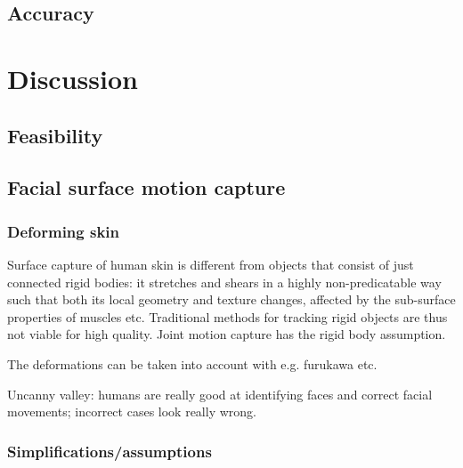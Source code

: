 \subsection{Accuracy}

\clearpage

\section{Discussion}






%
%
%



\subsection{Feasibility}

\subsection{Facial surface motion capture} %

\subsubsection{Deforming skin}

Surface capture of human skin is different from objects that consist of just connected rigid bodies: it stretches and shears in a highly non-predicatable way such that both its local geometry and texture changes, affected by the sub-surface properties of muscles etc.
Traditional methods for tracking rigid objects are thus not viable for high quality.
Joint motion capture has the rigid body assumption.

The deformations can be taken into account with e.g. furukawa etc.

Uncanny valley: humans are really good at identifying faces and correct facial movements; incorrect cases look really wrong.

\subsubsection{Simplifications/assumptions}

